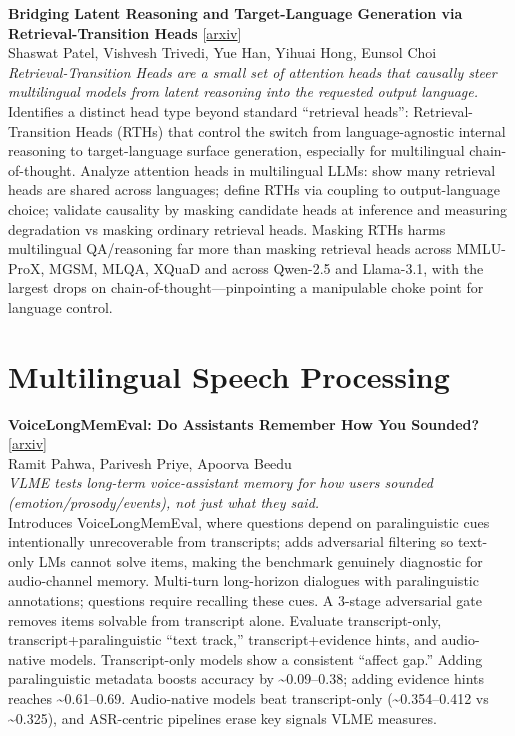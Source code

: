 \documentclass[12pt,letterpaper]{article}
\begin{document}
\medskip

{\small\textbf{Bridging Latent Reasoning and Target-Language Generation via Retrieval-Transition Heads}} {\scriptsize[\href{https://arxiv.org/abs/2602.22453}{arxiv}]}\\
{\scriptsize Shaswat Patel, Vishvesh Trivedi, Yue Han, Yihuai Hong, Eunsol Choi}\\

{\small\textit{Retrieval-Transition Heads are a small set of attention heads that causally steer multilingual models from latent reasoning into the requested output language.}}\\[1pt]
{\footnotesize Identifies a distinct head type beyond standard ``retrieval heads'': Retrieval-Transition Heads (RTHs) that control the switch from language-agnostic internal reasoning to target-language surface generation, especially for multilingual chain-of-thought. Analyze attention heads in multilingual LLMs: show many retrieval heads are shared across languages; define RTHs via coupling to output-language choice; validate causality by masking candidate heads at inference and measuring degradation vs masking ordinary retrieval heads. Masking RTHs harms multilingual QA/reasoning far more than masking retrieval heads across MMLU-ProX, MGSM, MLQA, XQuaD and across Qwen-2.5 and Llama-3.1, with the largest drops on chain-of-thought---pinpointing a manipulable choke point for language control.}

\medskip


\section*{Multilingual Speech Processing}

{\small\textbf{VoiceLongMemEval: Do Assistants Remember How You Sounded?}} {\scriptsize[\href{https://arxiv.org/abs/2609.00570}{arxiv}]}\\
{\scriptsize Ramit Pahwa, Parivesh Priye, Apoorva Beedu}\\

{\small\textit{VLME tests long-term voice-assistant memory for how users sounded (emotion/prosody/events), not just what they said.}}\\[1pt]
{\footnotesize Introduces VoiceLongMemEval, where questions depend on paralinguistic cues intentionally unrecoverable from transcripts; adds adversarial filtering so text-only LMs cannot solve items, making the benchmark genuinely diagnostic for audio-channel memory. Multi-turn long-horizon dialogues with paralinguistic annotations; questions require recalling these cues. A 3-stage adversarial gate removes items solvable from transcript alone. Evaluate transcript-only, transcript+paralinguistic ``text track,'' transcript+evidence hints, and audio-native models. Transcript-only models show a consistent ``affect gap.'' Adding paralinguistic metadata boosts accuracy by \textasciitilde{}0.09--0.38; adding evidence hints reaches \textasciitilde{}0.61--0.69. Audio-native models beat transcript-only (\textasciitilde{}0.354--0.412 vs \textasciitilde{}0.325), and ASR-centric pipelines erase key signals VLME measures.}
\end{document}
